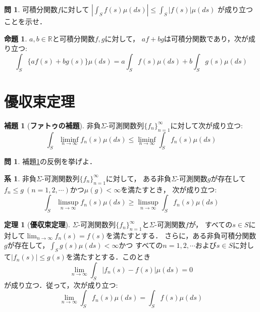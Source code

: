 \documentclass{jsreport}
\theoremstyle{definition}
\newtheorem{lem}[defi]{補題}
\newtheorem{prop}[defi]{命題}
\newtheorem{thm}[defi]{定理}
\newtheorem{cor}[defi]{系}
\newtheorem{qst}[defi]{問}
\begin{document}
\begin{qst}\label{qst_absolute_integral_and_integral_absolute}
可積分関数$f$に対して
$\displaystyle\left|\int_Sf(s)\mu(ds)\right|\leq\int_S|f(s)|\mu(ds)$
が成り立つことを示せ．
\end{qst}

\begin{prop}\label{prop_linearity_of_integrable_function_integral}
$a,b\in\mathbb{R}$と可積分関数$f,g$に対して，
$af+bg$は可積分関数であり，次が成り立つ:
\[ \int_S\{af(s)+bg(s)\}\mu(ds)=a\int_Sf(s)\mu(ds)+b\int_Sg(s)\mu(ds) \]
\end{prop}

\section{優収束定理}

\begin{lem}[\textbf{ファトゥの補題}]\label{Fatou_lemma}
非負$\Sigma$-可測関数列$\{f_n\}_{n=1}^\infty$に対して次が成り立つ:
\[ \int_S\liminf_{n\to\infty}f_n(s)\mu(ds)\leq\liminf_{n\to\infty}\int_S f_n(s)\mu(ds) \]
\end{lem}

\begin{qst}\label{qst_counterexample_of_Fatou_lemma}
補題\ref{Fatou_lemma}の反例を挙げよ．
\end{qst}

\begin{cor}\label{reverse_Fatou_lemma}
非負$\Sigma$-可測関数列$\{f_n\}_{n=1}^\infty$に対して，
ある非負$\Sigma$-可測関数$g$が存在して
$f_n \leq g\ (n=1,2,\cdots)$かつ$\mu(g)<\infty$を満たすとき，
次が成り立つ:
\[ \int_S\limsup_{n\to\infty}f_n(s)\mu(ds)\geq\limsup_{n\to\infty}\int_S f_n(s)\mu(ds) \]
\end{cor}

\begin{thm}[\textbf{優収束定理}]\label{dominated_convergence_theorem}
$\Sigma$-可測関数列$\{f_n\}_{n=1}^\infty$と$\Sigma$-可測関数$f$が，
すべての$s \in S$に対して$\displaystyle\lim_{n\to\infty}f_n(s)=f(s)$を満たすとする．
さらに，ある非負可積分関数$g$が存在して，$\displaystyle\int_Sg(s)\mu(ds)<\infty$かつ
すべての$n=1,2,\cdots$および$s \in S$に対して$|f_n(s)| \leq g(s)$を満たすとする．このとき
\[ \lim_{n\to\infty}\int_S|f_n(s)-f(s)|\mu(ds)=0 \]
が成り立つ．従って，次が成り立つ:
\[ \lim_{n\to\infty}\int_Sf_n(s)\mu(ds)=\int_Sf(s)\mu(ds) \]
\end{thm}

\end{document}

